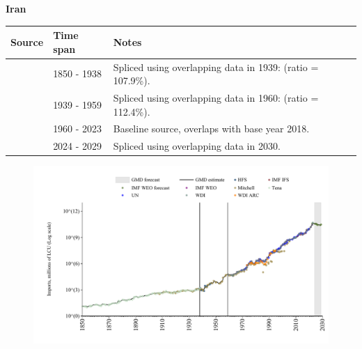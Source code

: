 \documentclass[12pt,a4paper,landscape]{article}
\begin{document}
\begin{adjustbox}{max totalsize={\paperwidth}{\paperheight},center}
\begin{minipage}[t][\textheight][t]{\textwidth}
\vspace*{0.5cm}
{}
\begin{center}
{\Large\bfseries Iran}
\end{center}
\vspace{0.5cm}
\begin{table}[H]
\centering
\small
\begin{tabular}{|l|l|l|}
\hline
\textbf{Source} & \textbf{Time span} & \textbf{Notes} \\
\hline
\rowcolor{white}\cite{Tena}& 1850 - 1938 &Spliced using overlapping data in 1939: (ratio = 107.9\%).\\
\rowcolor{lightgray}\cite{Mitchell}& 1939 - 1959 &Spliced using overlapping data in 1960: (ratio = 112.4\%).\\
\rowcolor{white}\cite{WDI}& 1960 - 2023 &Baseline source, overlaps with base year 2018.\\
\rowcolor{lightgray}\cite{IMF_WEO_forecast}& 2024 - 2029 &Spliced using overlapping data in 2030.\\
\hline
\end{tabular}
\end{table}
\begin{figure}[H]
\centering
\includegraphics[width=\textwidth,height=0.6\textheight,keepaspectratio]{graphs/IRN_imports.pdf}
\end{figure}
\end{minipage}
\end{adjustbox}
\end{document}
